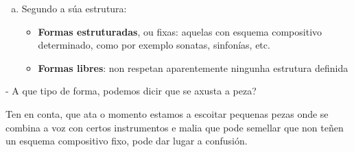\begin{enumerate}[1.-]
\begin{enumerate}[a)]
                \item 
                Segundo a súa estrutura:
                \begin{itemize}
                    \item 
                    \textbf{Formas estruturadas}, ou fixas: aquelas con esquema compositivo determinado, como por exemplo sonatas, sinfonías, etc.
                    \item
                    \textbf{Formas libres}: non respetan aparentemente ningunha estrutura definida
                \end{itemize}
            \end{enumerate}
        \par %
        - A que tipo de forma, podemos dicir que se axusta a peza? \dotfill
        \par %
        Ten en conta, que ata o momento estamos a escoitar pequenas pezas onde se combina a voz con certos instrumentos e malia que pode semellar que non teñen un esquema compositivo fixo, pode dar lugar a confusión.    
        \end{enumerate}
%
